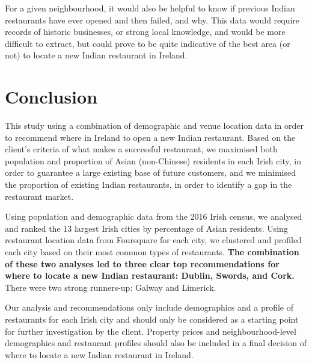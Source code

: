 \documentclass[a4paper,11pt]{article}
\begin{document}
For a given neighbourhood, it would also be helpful to know if previous Indian restaurants have ever opened and then failed, and why. This data would require records of historic businesses, or strong local knowledge, and would be more difficult to extract, but could prove to be quite indicative of the best area (or not) to locate a new Indian restaurant in Ireland.

\section{Conclusion}

This study using a combination of demographic and venue location data in order to recommend where in Ireland to open a new Indian restaurant. Based on the client's criteria of what makes a successful restaurant, we maximised both population and proportion of Asian (non-Chinese) residents in each Irish city, in order to guarantee a large existing base of future customers, and we minimised the proportion of existing Indian restaurants, in order to identify a gap in the restaurant market.

Using population and demographic data from the 2016 Irish census, we analysed and ranked the 13 largest Irish cities by percentage of Asian residents. Using restaurant location data from Foursquare for each city, we clustered and profiled each city based on their most common types of restaurants. \textbf{The combination of these two analyses led to three clear top recommendations for where to locate a new Indian restaurant: Dublin, Swords, and Cork.} There were two strong runners-up: Galway and Limerick.

Our analysis and recommendations only include demographics and a profile of restaurants for each Irish city and should only be considered as a starting point for further investigation by the client. Property prices and neighbourhood-level demographics and restaurant profiles should also be included in a final decision of where to locate a new Indian restaurant in Ireland.
\end{document}
